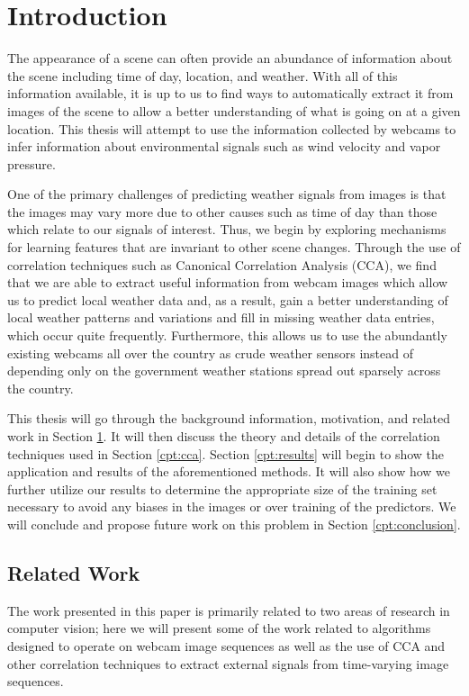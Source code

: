 \chapter{Introduction}
\label{cpt:intro}
The appearance of a scene can often provide an abundance of information about the scene including time of day, location, and weather. With all of this information available, it is up to us to find ways to automatically extract it from images of the scene to allow a better understanding of what is going on at a given location. This thesis will attempt to use the information collected by webcams to infer information about environmental signals such as wind velocity and vapor pressure. 

One of the primary challenges of predicting weather signals from images is that the images may vary more due to other causes such as time of day than those which relate to our signals of interest. Thus, we begin by exploring mechanisms for learning features that are invariant to other scene changes. Through the use of correlation techniques such as Canonical Correlation Analysis (CCA), we find that we are able to extract useful information from webcam images which allow us to predict local weather data and, as a result, gain a better understanding of local weather patterns and variations and fill in missing weather data entries, which occur quite frequently. Furthermore, this allows us to use the abundantly existing webcams all over the country as crude weather sensors instead of depending only on the government weather stations spread out sparsely across the country. 

This thesis will go through the background information, motivation, and related work in Section \ref{cpt:intro}. It will then discuss the theory and details of the correlation techniques used in Section \ref{cpt:cca}. Section \ref{cpt:results} will begin to show the application and results of the aforementioned methods. It will also show how we further utilize our results to determine the appropriate size of the training set necessary to avoid any biases in the images or over training of the predictors. We will conclude  and propose future work on this problem in Section \ref{cpt:conclusion}.

\section{Related Work}
The work presented in this paper is primarily related to two areas of research in computer vision; here we will present some of the work related to algorithms designed to operate on webcam image sequences as well as the use of CCA and other correlation techniques to extract external signals from time-varying image sequences.


